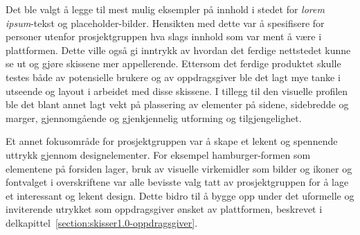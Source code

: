 Det ble valgt å legge til mest mulig eksempler på innhold i stedet for {\em lorem ipsum}-tekst og placeholder-bilder. Hensikten med dette var å spesifisere for personer utenfor prosjektgruppen hva slags innhold som var ment å være i plattformen. Dette ville også gi inntrykk av hvordan det ferdige nettstedet kunne se ut og gjøre skissene mer appellerende. Ettersom det ferdige produktet skulle testes både av potensielle brukere og av oppdragsgiver ble det lagt mye tanke i utseende og layout i arbeidet med disse skissene. I tillegg til den visuelle profilen ble det blant annet lagt vekt på plassering av elementer på sidene, sidebredde og marger, gjennomgående og gjenkjennelig utforming og tilgjengelighet. 

Et annet fokusområde for prosjektgruppen var å skape et lekent og spennende uttrykk gjennom designelementer. For eksempel hamburger-formen som elementene på forsiden lager, bruk av visuelle virkemidler som bilder og ikoner og fontvalget i overskriftene var alle bevisste valg tatt av prosjektgruppen for å lage et interessant og lekent design. Dette bidro til å bygge opp under det uformelle og inviterende utrykket som oppdragsgiver ønsket av plattformen, beskrevet i delkapittel~\ref{section:skisser1.0-oppdragsgiver}.

